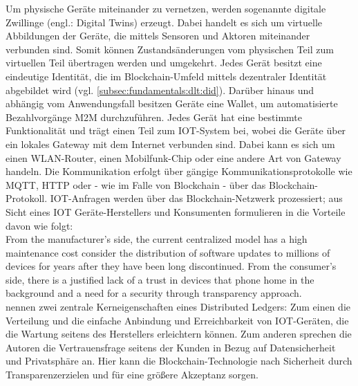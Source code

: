 Um physische Geräte miteinander zu vernetzen, werden sogenannte digitale Zwillinge (engl.: Digital Twins) erzeugt. Dabei handelt es sich um virtuelle Abbildungen der Geräte, die mittels Sensoren und Aktoren miteinander verbunden sind. Somit können Zustandsänderungen vom physischen Teil zum virtuellen Teil übertragen werden und umgekehrt. Jedes Gerät besitzt eine eindeutige Identität, die im Blockchain-Umfeld mittels dezentraler Identität abgebildet wird (vgl. \ref{subsec:fundamentals:dlt:did}). Darüber hinaus und abhängig vom Anwendungsfall besitzen Geräte eine Wallet, um automatisierte Bezahlvorgänge \ac{M2M} durchzuführen. Jedes Gerät hat eine bestimmte Funktionalität und trägt einen Teil zum \ac{IOT}-System bei, wobei die Geräte über ein lokales Gateway mit dem Internet verbunden sind. Dabei kann es sich um einen WLAN-Router, einen Mobilfunk-Chip oder eine andere Art von Gateway handeln. Die Kommunikation erfolgt über gängige Kommunikationsprotokolle wie MQTT, HTTP oder - wie im Falle von Blockchain - über das Blockchain-Protokoll. \ac{IOT}-Anfragen werden über das Blockchain-Netzwerk prozessiert; aus Sicht eines \ac{IOT} Geräte-Herstellers und Konsumenten formulieren \citeauthor{SCIOT2016} in \cite{SCIOT2016} die Vorteile davon wie folgt:\\
\glqq From the manufacturer's side, the current centralized model has a high maintenance cost consider the distribution of software updates to millions of devices for years after they have been long discontinued. From the consumer's side, there is a justified lack of a trust in devices that phone home in the background and a need for a security through transparency approach.\grqq\\
\citeauthor{SCIOT2016} nennen zwei zentrale Kerneigenschaften eines Distributed Ledgers: Zum einen die Verteilung und die einfache Anbindung und Erreichbarkeit von \ac{IOT}-Geräten, die die Wartung seitens des Herstellers erleichtern können. Zum anderen sprechen die Autoren die Vertrauensfrage seitens der Kunden in Bezug auf Datensicherheit und Privatsphäre an. Hier kann die Blockchain-Technologie nach \citeauthor{SCIOT2016} \glqq Sicherheit durch Transparenz\grqq erzielen und für eine größere Akzeptanz sorgen.\\

